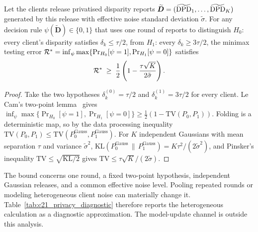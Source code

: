 \begin{proposition}
\label{thm:minimax_lecam}
Let the clients release privatised disparity reports $\widetilde{\bm{D}} = (\widetilde{\mathrm{DPD}}_1, \dots, \widetilde{\mathrm{DPD}}_K)$ generated by this release with effective noise standard deviation $\tilde{\sigma}$. For any decision rule $\psi(\widetilde{\bm{D}}) \in \{0, 1\}$ that uses one round of reports to distinguish $H_0$: every client's disparity satisfies $\delta_k \le \tau/2$, from $H_1$: every $\delta_k \ge 3\tau/2$, the minimax testing error $\mathcal{R}^* = \inf_\psi \max\{ \Pr_{H_0}[\psi=1], \Pr_{H_1}[\psi=0] \}$ satisfies
\begin{equation}
\label{eq:lecam_bound}
\mathcal{R}^* \;\ge\; \frac{1}{2} \left( 1 - \frac{\tau \sqrt{K}}{2 \tilde{\sigma}} \right).
\end{equation}
\end{proposition}
\begin{proof}
Take the two hypotheses $\delta_k^{(0)} = \tau/2$ and $\delta_k^{(1)} = 3\tau/2$ for every client. Le Cam's two-point lemma~\citep{lecam1973convergence, tsybakov2009nonparametric} gives
$\inf_\psi \max\{ \Pr_{H_0}[\psi=1], \Pr_{H_1}[\psi=0] \} \ge \frac{1}{2}( 1 - \mathrm{TV}(P_0, P_1))$.
Folding is a deterministic map, so by the data processing inequality $\mathrm{TV}(P_0, P_1) \le \mathrm{TV}(P_0^{\mathrm{Gauss}}, P_1^{\mathrm{Gauss}})$. For $K$ independent Gaussians with mean separation $\tau$ and variance $\tilde{\sigma}^2$,
$\mathrm{KL}(P_0^{\mathrm{Gauss}} \,\|\, P_1^{\mathrm{Gauss}}) = K\tau^2/(2\tilde{\sigma}^2)$, and Pinsker's inequality $\mathrm{TV} \le \sqrt{\mathrm{KL}/2}$ gives $\mathrm{TV} \le \tau\sqrt{K}/(2\tilde{\sigma})$.
\end{proof}

\begin{remark}
\label{rem:lecam_scope}
The bound concerns one round, a fixed two-point hypothesis, independent Gaussian releases, and a common effective noise level. Pooling repeated rounds or modeling heterogeneous client noise can materially change it. Table~\ref{tab:c21_privacy_diagnostic} therefore reports the heterogeneous calculation as a diagnostic approximation. The model-update channel is outside this analysis.
\end{remark}
